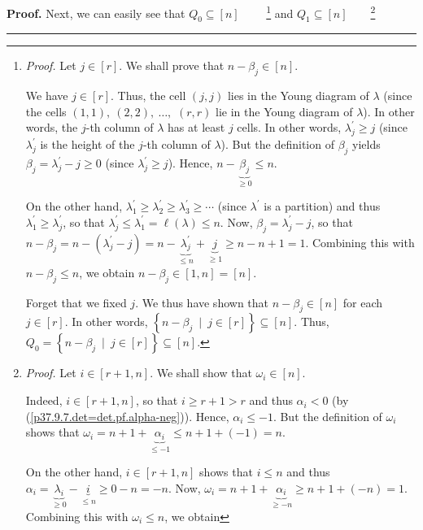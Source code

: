 \documentclass[numbers=enddot,12pt,final,onecolumn,notitlepage]{scrartcl}%
\theoremstyle{definition}
\newenvironment{proof}[1][Proof]{\noindent\textbf{#1.} }{\ \rule{0.5em}{0.5em}}
\begin{document}
\begin{enumerate}
\begin{proof}
Next, we can easily see that $Q_{0}\subseteq\left[  n\right]  $%
\ \ \ \ \footnote{\textit{Proof.} Let $j\in\left[  r\right]  $. We shall prove
that $n-\beta_{j}\in\left[  n\right]  $.
\par
We have $j\in\left[  r\right]  $. Thus, the cell $\left(  j,j\right)  $ lies
in the Young diagram of $\lambda$ (since the cells $\left(  1,1\right)
,\ \left(  2,2\right)  ,\ \ldots,$ $\left(  r,r\right)  $ lie in the Young
diagram of $\lambda$). In other words, the $j$-th column of $\lambda$ has at
least $j$ cells. In other words, $\lambda_{j}^{\prime}\geq j$ (since
$\lambda_{j}^{\prime}$ is the height of the $j$-th column of $\lambda$). But
the definition of $\beta_{j}$ yields $\beta_{j}=\lambda_{j}^{\prime}-j\geq0$
(since $\lambda_{j}^{\prime}\geq j$). Hence, $n-\underbrace{\beta_{j}}_{\geq
0}\leq n$.
\par
On the other hand, $\lambda_{1}^{\prime}\geq\lambda_{2}^{\prime}\geq
\lambda_{3}^{\prime}\geq\cdots$ (since $\lambda^{\prime}$ is a partition) and
thus $\lambda_{1}^{\prime}\geq\lambda_{j}^{\prime}$, so that $\lambda
_{j}^{\prime}\leq\lambda_{1}^{\prime}=\ell\left(  \lambda\right)  \leq n$.
Now, $\beta_{j}=\lambda_{j}^{\prime}-j$, so that $n-\beta_{j}=n-\left(
\lambda_{j}^{\prime}-j\right)  =n-\underbrace{\lambda_{j}^{\prime}}_{\leq
n}+\underbrace{j}_{\geq1}\geq n-n+1=1$. Combining this with $n-\beta_{j}\leq
n$, we obtain $n-\beta_{j}\in\left[  1,n\right]  =\left[  n\right]  $.
\par
Forget that we fixed $j$. We thus have shown that $n-\beta_{j}\in\left[
n\right]  $ for each $j\in\left[  r\right]  $. In other words, $\left\{
n-\beta_{j}\ \mid\ j\in\left[  r\right]  \right\}  \subseteq\left[  n\right]
$. Thus, $Q_{0}=\left\{  n-\beta_{j}\ \mid\ j\in\left[  r\right]  \right\}
\subseteq\left[  n\right]  $.} and $Q_{1}\subseteq\left[  n\right]
$\ \ \ \ \footnote{\textit{Proof.} Let $i\in\left[  r+1,n\right]  $. We shall
show that $\omega_{i}\in\left[  n\right]  $.
\par
Indeed, $i\in\left[  r+1,n\right]  $, so that $i\geq r+1>r$ and thus
$\alpha_{i}<0$ (by (\ref{p37.9.7.det=det.pf.alpha-neg})). Hence, $\alpha
_{i}\leq-1$. But the definition of $\omega_{i}$ shows that $\omega
_{i}=n+1+\underbrace{\alpha_{i}}_{\leq-1}\leq n+1+\left(  -1\right)  =n$.
\par
On the other hand, $i\in\left[  r+1,n\right]  $ shows that $i\leq n$ and thus
$\alpha_{i}=\underbrace{\lambda_{i}}_{\geq0}-\underbrace{i}_{\leq n}%
\geq0-n=-n$. Now, $\omega_{i}=n+1+\underbrace{\alpha_{i}}_{\geq-n}\geq
n+1+\left(  -n\right)  =1$. Combining this with $\omega_{i}\leq n$, we obtain
}
\end{proof}
\end{enumerate}
\end{document}
